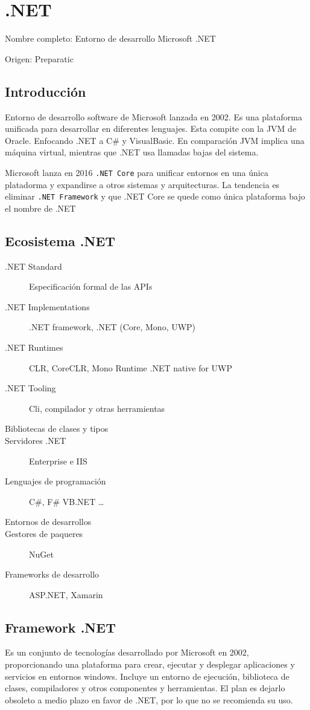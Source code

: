 \setcounter{section}{65}
\section{.NET}

Nombre completo: Entorno de desarrollo Microsoft .NET

Origen: Preparatic

\localtableofcontents

\subsection{Introducción}
    Entorno de desarrollo software de Microsoft lanzada en 2002. Es una plataforma unificada para desarrollar en diferentes lenguajes. Esta compite con la JVM de Oracle. Enfocando .NET a C\# y VisualBasic. En comparación JVM implica una máquina virtual, mientras que .NET usa llamadas bajas del sistema.

    Microsoft lanza en 2016 \texttt{.NET Core} para unificar entornos en una única platadorma y expandirse a otros sistemas y arquitecturas. La tendencia es eliminar \texttt{.NET Framework} y que .NET Core se quede como única plataforma bajo el nombre de .NET

\subsection{Ecosistema .NET}
\begin{description}
    \item[.NET Standard] Especificación formal de las APIs
    \item[.NET Implementations] .NET framework, .NET (Core, Mono, UWP)
    \item[.NET Runtimes] CLR, CoreCLR, Mono Runtime .NET native for UWP
    \item[.NET Tooling] Cli, compilador y otras herramientas
    \item[Bibliotecas de clases y tipos] 
    \item[Servidores .NET] Enterprise e IIS
    \item[Lenguajes de programación] C\#, F\# VB.NET \dots
    \item[Entornos de desarrollos]
    \item[Gestores de paqueres] NuGet
    \item[Frameworks de desarrollo] ASP.NET, Xamarin
\end{description}

\subsection{Framework .NET}
    Es un conjunto de tecnologías desarrollado por Microsoft en 2002, proporcionando una plataforma para crear, ejecutar y desplegar aplicaciones y servicios en entornos windows. Incluye un entorno de ejecución, biblioteca de clases, compiladores y otros componentes y herramientas. El plan es dejarlo obsoleto a medio plazo en favor de .NET, por lo que no se recomienda su uso.

